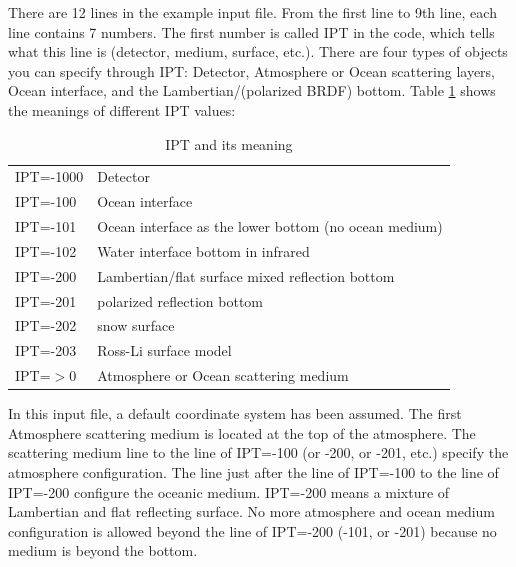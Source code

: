 \documentclass[10pt,letterpaper]{article}
\begin{document}
There are 12 lines in the example input file.  From the first line to 9th line, each line contains 7 numbers.  The first number is called IPT in the code, which tells what this line is (detector, medium, surface, etc.).  There are four types of objects you can specify through IPT:  Detector, Atmosphere or Ocean scattering layers, Ocean interface, and the Lambertian/(polarized BRDF) bottom.  Table \ref{tab:IPT} shows the meanings of different IPT values:

\begin{table}
\caption{IPT and its meaning}
\vspace{0.2 in}
\centering
\begin{tabular}{ll}
IPT=-1000 & Detector \\
IPT=-100   & Ocean interface\\
IPT=-101   & Ocean interface as the lower bottom (no ocean medium)\\
IPT=-102   & Water interface bottom in infrared \\
IPT=-200   & Lambertian/flat surface mixed reflection bottom   \\
IPT=-201   & polarized reflection bottom  \\
IPT=-202   & snow surface  \\
IPT=-203   & Ross-Li surface model  \\
IPT=$>$0  & Atmosphere or Ocean scattering medium
\end{tabular}
\label{tab:IPT}
\end{table}

In this input file, a default coordinate system has been assumed.  The first Atmosphere scattering medium is located at the top of the atmosphere.  
The scattering medium line to the line of IPT=-100 (or -200, or -201, etc.) specify the atmosphere configuration.  
The line just after the line of IPT=-100 to the line of IPT=-200 configure the oceanic medium.
IPT=-200 means a mixture of Lambertian and flat reflecting surface.  
No more atmosphere and ocean medium configuration is allowed beyond the line of IPT=-200 (-101, or -201) because no medium is beyond the bottom.
\end{document}
